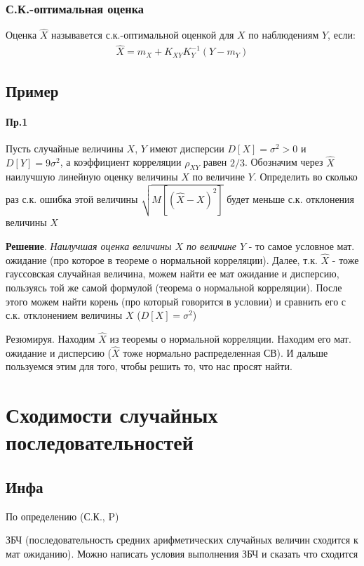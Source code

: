 \documentclass[12pt]{extarticle}
\begin{document}
\subsubsection{С.К.-оптимальная оценка}
Оценка $\hat{X}$ называвется с.к.-оптимальной оценкой для $X$ по
наблюдениям $Y$, если:
\begin{eqnarray*}
    \hat{X}=m_{X}+K_{XY}K_{Y}^{-1}(Y-m_{Y})
\end{eqnarray*}

\subsection{Пример}
\paragraph{Пр.1}
Пусть случайные величины $X$, $Y$ имеют дисперсии $D[X]=\sigma^{2}>0$ и
$D[Y]=9\sigma^{2}$, а коэффициент корреляции $\rho_{XY}$ равен $2/3$.
Обозначим через $\hat{X}$ наилучшую линейную оценку величины $X$ по
величине $Y$. Определить во сколько раз с.к. ошибка этой величины
$\sqrt{M[(\hat{X}-X)^{2}]}$ будет меньше с.к. отклонения величины $X$

\par\textbf{Решение}. \textit{Наилучшая оценка величины $X$ по величине $Y$} - то самое
условное мат. ожидание (про которое в теореме о нормальной корреляции).
Далее, т.к. $\hat{X}$ - тоже гауссовская случайная величина, можем найти
ее мат ожидание и дисперсию, пользуясь той же самой формулой (теорема о
нормальной корреляции). После этого можем найти корень (про который
говорится в условии) и сравнить его с с.к. отклонением величины $X$
($D[X]=\sigma^{2}$)

\par Резюмируя. Находим $\hat{X}$ из теоремы о нормальной корреляции.
Находим его мат. ожидание и дисперсию ($\hat{X}$ тоже нормально
распределенная СВ). И дальше пользуемся этим для того, чтобы решить то,
что нас просят найти.

\section{Сходимости случайных последовательностей}
\subsection{Инфа}
\begin{description}
    \item По определению (С.К., P)
    \item ЗБЧ (последовательность средних арифметических случайных величин
        сходится к мат ожиданию). Можно написать условия выполнения ЗБЧ и
        сказать что сходится
\end{description}
\end{document}
